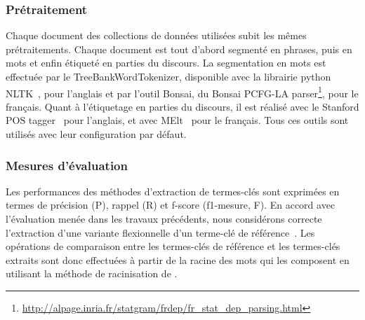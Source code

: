     \subsubsection{Prétraitement}
    \label{subsubsec:pretraitement}
      Chaque document des collections de données utilisées subit les mêmes
      prétraitements. Chaque document est tout d'abord segmenté en phrases, puis
      en mots et enfin étiqueté en parties du discours. La segmentation en mots
      est effectuée par le TreeBankWordTokenizer, disponible avec la librairie
      python NLTK~\cite[\textit{Natural Language ToolKit}]{bird2009nltk}, pour
      l'anglais et par l'outil Bonsai, du Bonsai PCFG-LA
      parser\footnote{\url{http://alpage.inria.fr/statgram/frdep/fr_stat_dep_parsing.html}},
      pour le français. Quant à l'étiquetage en parties du discours, il est
      réalisé avec le Stanford POS tagger~\cite{toutanova2003stanfordpostagger}
      pour l'anglais, et avec MElt~\cite{denis2009melt} pour le français. Tous
      ces outils sont utilisés avec leur configuration par défaut.

    \subsubsection{Mesures d'évaluation}
    \label{subsubsec:mesures_d_evaluation}
      Les performances des méthodes d'extraction de termes-clés sont exprimées
      en termes de précision (P), rappel (R) et f-score (f1-mesure, F). En
      accord avec l'évaluation menée dans les travaux précédents, nous
      considérons correcte l'extraction d'une variante flexionnelle d'un
      terme-clé de référence~\cite{kim2010semeval}. Les opérations de
      comparaison entre les termes-clés de référence et les termes-clés extraits
      sont donc effectuées à partir de la racine des mots qui les composent en
      utilisant la méthode de racinisation de
      .

